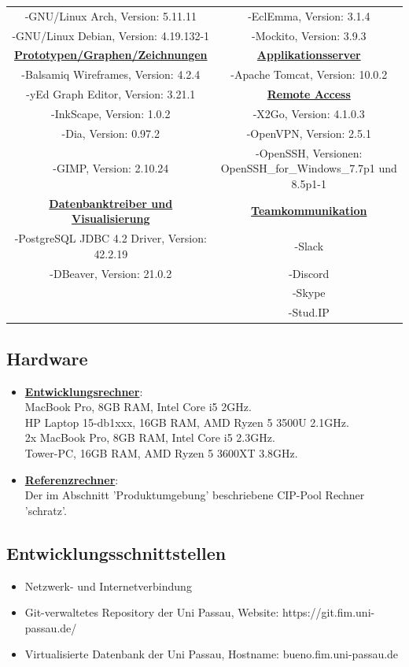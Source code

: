 \documentclass{article}
\begin{document}
\begin{center}
\begin{table}
\begin{adjustwidth}{-1.5cm}{-1cm}
\begin{tabular} { c c }
-GNU/Linux Arch, Version: 5.11.11 &-EclEmma, Version: 3.1.4\\
-GNU/Linux Debian, Version: 4.19.132-1 &-Mockito, Version: 3.9.3\\
\underline{\textbf{Prototypen/Graphen/Zeichnungen}} & \underline{\textbf{Applikationsserver}}\\
-Balsamiq Wireframes, Version: 4.2.4 &-Apache Tomcat, Version: 10.0.2\\
-yEd Graph Editor, Version: 3.21.1 & \underline{\textbf{Remote Access}}\\
-InkScape, Version: 1.0.2 &-X2Go, Version: 4.1.0.3\\
-Dia, Version: 0.97.2  &-OpenVPN, Version: 2.5.1\\
-GIMP, Version: 2.10.24 &-OpenSSH, Versionen: OpenSSH\_for\_Windows\_7.7p1 und 8.5p1-1\\
\underline{\textbf{Datenbanktreiber und Visualisierung}}& \underline{\textbf{Teamkommunikation}}\\
-PostgreSQL JDBC 4.2 Driver, Version: 42.2.19 &-Slack\\
-DBeaver, Version: 21.0.2 &-Discord\\
&-Skype\\
&-Stud.IP\\
\end{tabular}
\end{adjustwidth}
\end{table}
\end{center}
\subsection{Hardware}
\begin{itemize}
\item \underline{\textbf{Entwicklungsrechner}}:\\
MacBook Pro, 8GB RAM, Intel Core i5 2GHz.\\
HP Laptop 15-db1xxx, 16GB RAM, AMD Ryzen 5 3500U 2.1GHz.\\
2x MacBook Pro, 8GB RAM, Intel Core i5 2.3GHz.\\
Tower-PC, 16GB RAM, AMD Ryzen 5 3600XT 3.8GHz.
\item \underline{\textbf{Referenzrechner}}:\\
Der im Abschnitt 'Produktumgebung' beschriebene CIP-Pool Rechner 'schratz'.
\end{itemize}
\subsection{Entwicklungsschnittstellen}
\begin{itemize}
\item Netzwerk- und Internetverbindung
\item Git-verwaltetes Repository der Uni Passau, Website: https://git.fim.uni-passau.de/
\item Virtualisierte Datenbank der Uni Passau, Hostname: bueno.fim.uni-passau.de
\end{itemize}
\end{document}
